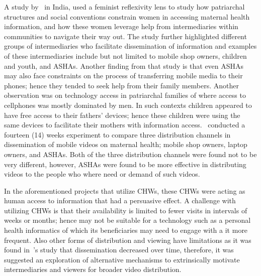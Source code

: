 A study by~\cite{kumar2015mobile} in India, used a feminist reflexivity lens to study how patriarchal structures and social conventions constrain women in accessing maternal health information, and how these women leverage help from intermediaries within communities to navigate their way out. The study further highlighted different groups of intermediaries who facilitate dissemination of information and examples of these intermediaries include but not limited to mobile shop owners, children and youth, and ASHAs. Another finding from that study is that even ASHAs may also face constraints on the process of transferring mobile media to their phones; hence they tended to seek help from their family members. Another observation was on technology access in patriarchal families of where access to cellphones was mostly dominated by men. In such contexts children appeared to have free access to their fathers' devices; hence these children were using the same devices to facilitate their mothers with information access.~\cite{vashistha2016mobile} conducted a fourteen (14) weeks experiment to compare three distribution channels in dissemination of mobile videos on maternal health; mobile shop owners, laptop owners, and ASHAs. Both of the three distribution channels were found not to be very different, however, ASHAs were found to be more effective in distributing videos to the people who where need or demand of such videos.

In the aforementioned projects that utilize CHWs, these CHWs were acting as human access to information that had a persuasive effect. A challenge with utilizing CHWs is that their availability is limited to fewer visits in intervals of weeks or months; hence may not be suitable for a technology such as a personal health informatics of which its beneficiaries may need to engage with a it more frequent. Also other forms of distribution and viewing have limitations as it was found in~\cite{vashistha2016mobile}'s study that dissemination decreased over time, therefore, it was  suggested an exploration of alternative mechanisms  to extrinsically motivate intermediaries and viewers for broader video distribution.

